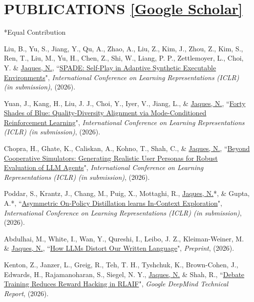 \documentclass[paper=letter,fontsize=11pt]{scrartcl} %
\newcommand{\NewPart}[2]{\section*{\uppercase{#1} #2}}
\newcommand{\PaperEntry}[6]{
		\noindent #1, ``\href{#6}{#2}", \textit{#3}, #4 (#5).}
\begin{document}
\NewPart{Publications}{\href{https://scholar.google.co.uk/citations?user=8iCb2TwAAAAJ&hl=en}{[Google Scholar]}}
*Equal Contribution
\begin{etaremune}


\item \PaperEntry{Liu, B., Yu, S., Jiang, Y., Qu, A., Zhao, A., Liu, Z., Kim, J., Zhou, Z., Kim, S., Ren, T., Liu, M., Yu, H., Chen, Z., Shi, W., Liang, P. P., Zettlemoyer, L., Choi, Y. \& \underline{Jaques, N.}}{SPADE: Self-Play in Adaptive Synthetic Executable Environments}{International Conference on Learning Representations (ICLR) (in submission)}{}{2026}{https://arxiv.org/abs/2608.19197}

\item \PaperEntry{Yuan, J., Kang, H., Liu, J. J., Choi, Y., Iyer, V., Jiang, L., \& \underline{Jaques, N.}}{Forty Shades of Blue: Quality-Diversity Alignment via Mode-Conditioned Reinforcement Learning}{International Conference on Learning Representations (ICLR) (in submission)}{}{2026}{https://arxiv.org/abs/2609.14896 }

\item \PaperEntry{Chopra, H., Ghate, K., Caliskan, A., Kohno, T., Shah, C., \& \underline{Jaques, N.}}{Beyond Cooperative Simulators: Generating Realistic User Personas for Robust Evaluation of LLM Agents}{International Conference on Learning Representations (ICLR) (in submission)}{}{2026}{https://arxiv.org/abs/2605.12894}

\item \PaperEntry{Poddar, S., Krantz, J., Chang, M., Puig, X., Mottaghi, R., \underline{Jaques, N.}*, \& Gupta, A.*}{Asymmetric On-Policy Distillation learns In-Context Exploration}{International Conference on Learning Representations (ICLR) (in submission)}{}{2026}{}

\item \PaperEntry{Abdulhai, M., White, I., Wan, Y., Qureshi, I., Leibo, J. Z., Kleiman-Weiner, M. \& \underline{Jaques, N.}}{How LLMs Distort Our Written Language}{Preprint}{}{2026}{https://arxiv.org/abs/2603.18161}

\item \PaperEntry{Kenton, Z., Janzer, L., Greig, R., Teh, T. H., Tyshchuk, K., Brown-Cohen, J., Edwards, H., Rajamanoharan, S., Siegel, N. Y., \underline{Jaques, N.} \& Shah, R.}{Debate Training Reduces Reward Hacking in RLAIF}{Google DeepMind Technical Report}{}{2026}{https://arxiv.org/abs/2608.17776}


\end{etaremune}
\end{document}
